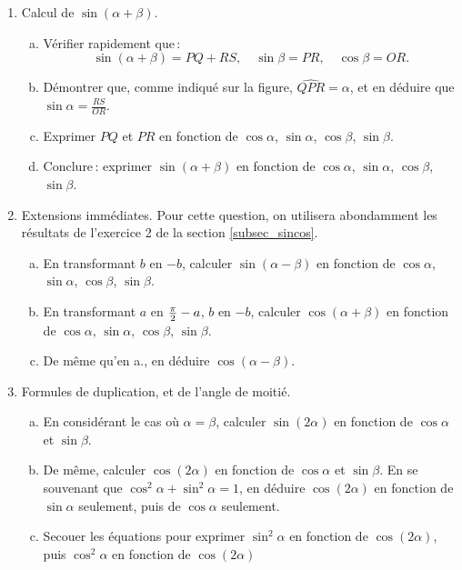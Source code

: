 	\begin{enumerate}
		\item Calcul de $\sin(\alpha+\beta)$.
		\begin{enumerate}[a.]
			\item Vérifier rapidement que\,:
			\begin{equation}
			 	\sin(\alpha+\beta)=PQ+RS,\quad \sin\beta=PR,\quad \cos\beta=OR.
			\end{equation} 
			\item Démontrer que, comme indiqué sur la figure, $\widehat{QPR}=\alpha$, et en déduire que $\sin\alpha=\frac{RS}{OR}$.
			\item Exprimer $PQ$ et $PR$ en fonction de $\cos\alpha$, $\sin\alpha$, $\cos\beta$, $\sin\beta$.
			\item Conclure\,: exprimer $\sin(\alpha+\beta)$ en fonction de $\cos\alpha$, $\sin\alpha$, $\cos\beta$, $\sin\beta$.
		\end{enumerate}
		\item Extensions immédiates. Pour cette question, on utilisera abondamment les résultats de l'exercice 2 de la section \ref{subsec_sincos}.
		\begin{enumerate}[a.]
			\item En transformant $b$ en $-b$, calculer $\sin(\alpha-\beta)$ en fonction de $\cos\alpha$, $\sin\alpha$, $\cos\beta$, $\sin\beta$.
			\item En transformant $a$ en $\frac{\pi}{2}-a$, $b$ en $-b$, calculer $\cos(\alpha+\beta)$ en fonction de $\cos\alpha$, $\sin\alpha$, $\cos\beta$, $\sin\beta$.
			\item De même qu'en a., en déduire $\cos(\alpha-\beta)$.
		\end{enumerate}
		\item Formules de duplication, et de l'angle de moitié.
		\begin{enumerate}[a.]
			\item En considérant le cas où $\alpha=\beta$, calculer $\sin(2\alpha)$  en fonction de $\cos\alpha$ et $\sin\beta$.
			\item De même, calculer $\cos(2\alpha)$ en fonction de  $\cos\alpha$ et $\sin\beta$. En se souvenant que $\cos^2\alpha+\sin^2\alpha=1$, en déduire $\cos(2\alpha)$ en fonction de $\sin\alpha$ seulement, puis de $\cos\alpha$ seulement.
			\item Secouer les équations pour exprimer $\sin^2\alpha$ en fonction de $\cos(2\alpha)$, puis $\cos^2\alpha$ en fonction de $\cos(2\alpha)$
		\end{enumerate}
	\end{enumerate}

